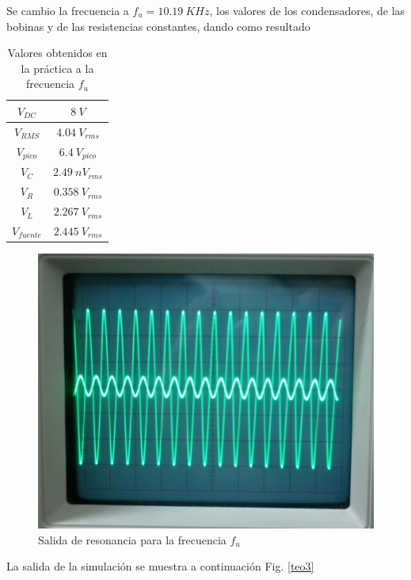 \documentclass[twocolumn]{IEEEtran}
\begin{document}
\noindent
Se cambio la frecuencia a $f_u = 10.19\ KHz$, los valores de los condensadores, de las bobinas y de las resistencias constantes, dando como resultado
\begin{table}[H]
	\centering
\begin{tabular}[c]{|c|c|} \hline
$V_{DC}$ & $8 \ V$ \\ \hline
$V_{RMS}$ & $4.04 \ V_{rms}$ \\ \hline
$V_{pico}$ & $6.4 \ V_{pico}$ \\ \hline
$V_{C}$ & $2.49 \ nV_{rms}$ \\ \hline
$V_{R}$ & $0.358 \ V_{rms}$ \\ \hline
$V_{L}$ & $2.267 \ V_{rms}$ \\ \hline
$V_{fuente}$ & $2.445 \ V_{rms}$ \\ \hline
\end{tabular}
	\caption{Valores obtenidos en la práctica a la frecuencia $f_u$}
	\label{tab3}
\end{table}
\begin{figure}[H]
	\centering
		\includegraphics[scale=0.1]{367.png}
	\caption{Salida de resonancia para la frecuencia $f_u$}
	\label{fig3}
\end{figure}
\noindent
La salida de la simulación se muestra a continuación Fig. \ref{teo3}
\end{document}
